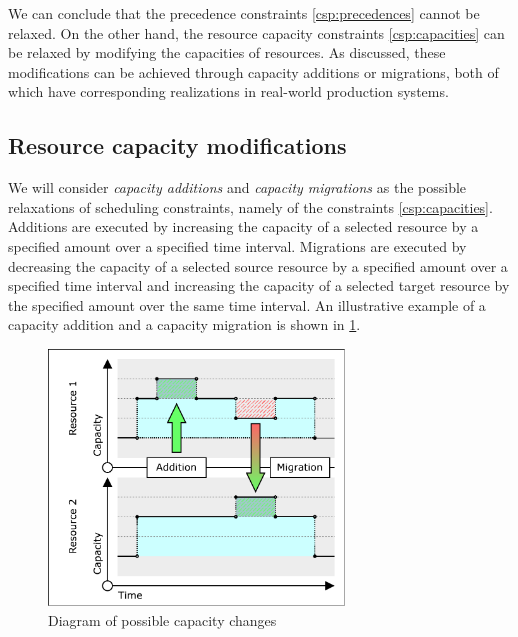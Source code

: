 We can conclude that the precedence constraints \eqref{csp:precedences} cannot be relaxed.
On the other hand, the resource capacity constraints \eqref{csp:capacities}
can be relaxed by modifying the capacities of resources.
As discussed,
these modifications can be achieved through capacity additions or migrations,
both of which have corresponding realizations in real-world production systems.

\subsection{Resource capacity modifications} \label{subsec:problem-statement/bottlenecks/resource-capacity-modifications}

We will consider \emph{capacity additions} and \emph{capacity migrations} as the possible relaxations
of scheduling constraints, namely of the constraints \eqref{csp:capacities}.
Additions are executed by increasing the capacity of a selected resource
by a specified amount over a specified time interval.
Migrations are executed by decreasing the capacity of a selected source resource
by a specified amount over a specified time interval
and increasing the capacity of a selected target resource
by the specified amount over the same time interval.
An illustrative example of a capacity addition and a capacity migration is shown in \cref{fig:CapacityChanges}.

\begin{figure}
    \centering
    \includegraphics[width=0.7\textwidth]{img/Capacities-Changes.pdf}
    \caption{Diagram of possible capacity changes}
    \label{fig:CapacityChanges}
\end{figure}

